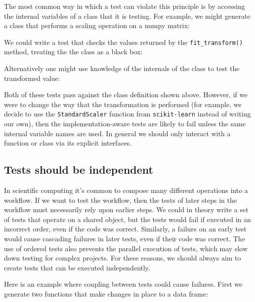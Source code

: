 The most common way in which a test can violate this principle is by accessing the internal variables of a class that it is testing.
For example, we might generate a class that performs a scaling operation on a numpy matrix:



We could write a test that checks the values returned by the \texttt{fit\_transform()} method, treating the the class as a black box:



Alternatively one might use knowledge of the internals of the class to test the transformed value:



Both of these tests pass against the class definition shown above.
However, if we were to change the way that the transformation is performed (for example, we decide to use the \texttt{StandardScaler} function from \texttt{scikit-learn} instead of writing our own), then the implementation-aware tests are likely to fail unless the same internal variable names are used.
In general we should only interact with a function or class via its explicit interfaces.

\subsection{Tests should be independent}

In scientific computing it's common to compose many different operations into a workflow.
If we want to test the workflow, then the tests of later steps in the workflow must necessarily rely upon earlier steps.
We could in theory write a set of tests that operate on a shared object, but the tests would fail if executed in an incorrect order, even if the code was correct.
Similarly, a failure on an early test would cause cascading failures in later tests, even if their code was correct.
The use of ordered tests also prevents the parallel execution of tests, which may slow down testing for complex projects.
For these reasons, we should always aim to create tests that can be executed independently.

Here is an example where coupling between tests could cause failures.
First we generate two functions that make changes in place to a data frame:

